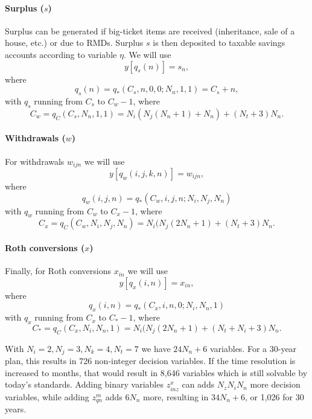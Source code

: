 \documentclass{report}[fleqn,12pt]
\begin{document}
\paragraph*{Surplus (\boldmath$s$)}
Surplus can be generated if big-ticket items are received (inheritance, sale of a house, etc.)
or due to RMDs. Surplus $s$ is then deposited to taxable savings accounts according
to variable $\eta$. We will use
\begin{equation}
	y[q_s(n)] = s_{n},
\end{equation}
where
\begin{equation}
	q_s(n) = q_*(C_s, n, 0, 0; N_n, 1, 1) = C_s + n,
\end{equation}
with $q_s$ running from $C_s$ to $C_w - 1$, where
\[
	C_w = q_C(C_s, N_n, 1, 1) = N_i(N_j(N_n+1) + N_n) + (N_t + 3) N_n.
\]

\paragraph*{Withdrawals (\boldmath$w$)}
For withdrawals $w_{ijn}$ we will use
\begin{equation}
	y[q_w(i, j, k, n)] = w_{i j n},
\end{equation}
where
\begin{equation}
	q_w(i, j, n) = q_*(C_w, i, j, n; N_i, N_j, N_n)
\end{equation}
with $q_w$ running from $C_w$ to $C_x - 1$, where
\[
	C_x = q_C(C_w, N_i, N_j, N_n) = N_i(N_j(2N_n + 1) + (N_t + 3) N_n.
\]

\paragraph*{Roth conversions (\boldmath$x$)}
Finally, for Roth conversions $x_{in}$ we will use
\begin{equation}
	y[q_x(i, n)] = x_{i n},
\end{equation}
where
\begin{equation}
	q_x(i, n) = q_*(C_x, i, n, 0; N_i, N_n, 1)
\end{equation}
with $q_x$ running from $C_x$ to $C_* - 1$, where
\begin{equation}
	\label{Eq:Cstar}
	C_* = q_C(C_x, N_i, N_n, 1) = N_i(N_j(2N_n + 1) + (N_t + N_i + 3) N_n.
\end{equation}

With $N_i = 2, N_j = 3, N_k = 4, N_t = 7$ we have $24 N_n + 6$ variables. For
a 30-year plan, this results in 726 non-integer decision variables.
If the time resolution is increased to
months, that would result in 8,646 variables which is still solvable by today's standards.
Adding binary variables $z^x_{inz}$ can adds $N_zN_iN_n$ more decision variables,
while adding $z^m_{qn}$ adds $6N_n$ more, resulting in $34 N_n + 6$, or 1,026 for 30 years.
\end{document}
